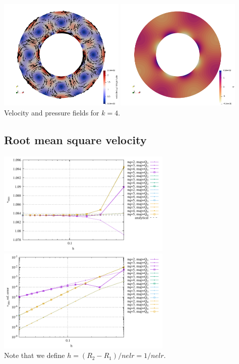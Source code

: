 \begin{center}
\includegraphics[width=6cm]{python_codes/fieldstone_152/images/vel}
\includegraphics[width=6cm]{python_codes/fieldstone_152/images/press}\\
{\captionfont Velocity and pressure fields for $k=4$.}
\end{center}





\subsection*{Root mean square velocity}

\begin{center}
\includegraphics[width=8.3cm]{python_codes/fieldstone_152/results/exp0/vrms}
\includegraphics[width=8.3cm]{python_codes/fieldstone_152/results/exp0/vrms_error}\\
{\captionfont Note that we define $h=(R_2-R_1)/nelr=1/nelr$.}
\end{center}

